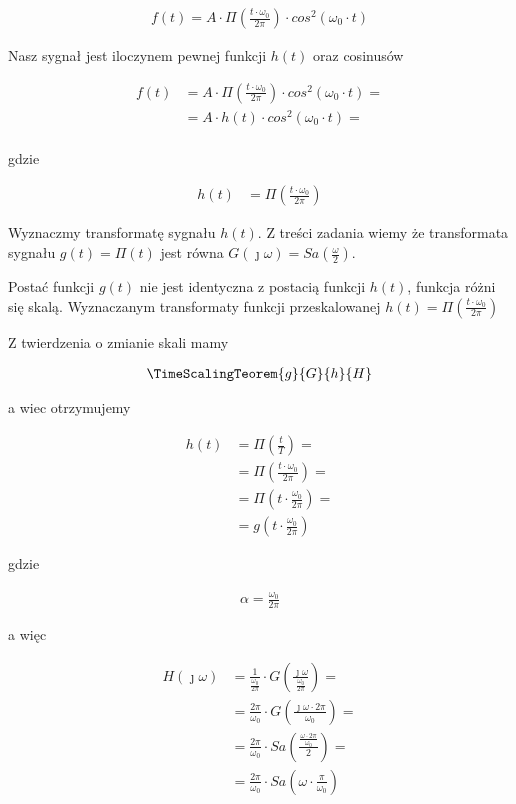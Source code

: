 \begin{task}
\begin{align*}
f(t) = A\cdot \Pi\left(\frac{t \cdot \omega_0}{2\pi}\right) \cdot cos^2\left(\omega_0 \cdot t\right)
\end{align*}

Nasz sygnał jest iloczynem pewnej funkcji $h(t)$ oraz cosinusów

\begin{align*}
f(t) &= A\cdot \Pi\left(\frac{t \cdot \omega_0}{2\pi}\right) \cdot cos^2\left(\omega_0 \cdot t\right) = \\
&= A\cdot h(t) \cdot cos^2\left(\omega_0 \cdot t\right) = \\
\end{align*}

gdzie

\begin{align*}
h(t)&= \Pi\left(\frac{t \cdot \omega_0}{2\pi}\right)
\end{align*}

Wyznaczmy transformatę sygnału $h(t)$. Z treści zadania wiemy że transformata sygnału $g(t)=\Pi\left(t\right)$ jest równa $G(\jmath\omega)=Sa\left(\frac{\omega}{2}\right)$. 

Postać funkcji $g(t)$ nie jest identyczna z postacią funkcji $h(t)$, funkcja różni się skalą. 
Wyznaczanym transformaty funkcji przeskalowanej $h(t)=\Pi\left(\frac{t \cdot \omega_0}{2\pi}\right)$

Z twierdzenia o zmianie skali mamy 

\begin{align*}
\TimeScalingTeorem{g}{G}{h}{H}
\end{align*}

a wiec otrzymujemy

\begin{align*}
h(t) &= \Pi\left(\frac{t}{T}\right)=\\
&=\Pi\left(\frac{t \cdot \omega_0}{2\pi}\right)=\\
&=\Pi\left(t \cdot \frac{\omega_0}{2\pi}\right)=\\
&=g\left(t \cdot \frac{\omega_0}{2\pi}\right)
\end{align*}

gdzie

\begin{align*}
\alpha=\frac{\omega_0}{2\pi}
\end{align*}

a więc

\begin{align*}
H(\jmath \omega)&=\frac{1}{\frac{\omega_0}{2\pi}} \cdot G\left(\frac{\jmath \omega}{\frac{\omega_0}{2\pi}}\right)=\\
&=\frac{2\pi}{\omega_0} \cdot G\left(\frac{\jmath \omega \cdot 2 \pi}{\omega_0}\right)=\\
&=\frac{2\pi}{\omega_0} \cdot Sa\left(\frac{\frac{\omega \cdot 2 \pi}{\omega_0}}{2}\right)=\\
&=\frac{2\pi}{\omega_0} \cdot Sa\left(\omega \cdot \frac{\pi}{\omega_0}\right)
\end{align*}


\end{task}
